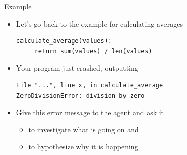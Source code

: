 \documentclass[
ps,
]{prosper}
\begin{document}
\begin{slide}{Example}

\begin{itemize}

\item Let's go back to the example for calculating averages

\begin{verbatim}
calculate_average(values):
     return sum(values) / len(values)
\end{verbatim}

\item Your program just crashed, outputting

\begin{verbatim}
File "...", line x, in calculate_average
ZeroDivisionError: division by zero
\end{verbatim}
  
\item Give this error message to the agent and ask it

  \begin{itemize}
    
  \item to investigate what is going on and

  \item to hypothesize why it is happening
    
  \end{itemize}
  
\end{itemize}
  
\end{slide}
\end{document}
